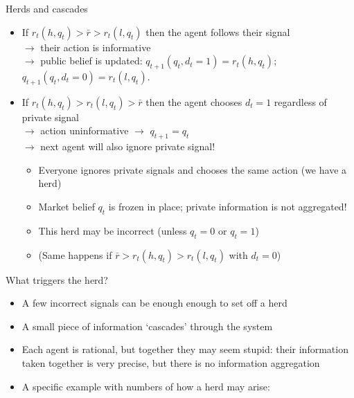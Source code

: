 \documentclass[english,10pt
,aspectratio=169
]{beamer}
\begin{document}
\begin{frame}{Herds and cascades}
	\begin{itemize}
		\item If $r_t(h,q_t) > \bar{r} > r_t(l,q_t)$ then the agent follows their signal 
		\\$\to$ their action is informative 
		\\$\to$ public belief is updated: $q_{t+1}(q_t,d_t=1) = r_t(h,q_t)$; $q_{t+1}(q_t,d_t=0) = r_t(l,q_t)$.
		
		\item If $r_t(h,q_t) > r_t(l,q_t) > \bar{r}$ then the agent chooses $d_t=1$ regardless of private signal 
		\\$\to$ action uninformative $\to$ $q_{t+1} = q_t$ 
		\\$\to$ next agent will also ignore private signal!
		\begin{itemize}
			\item Everyone ignores private signals and chooses the same action (we have a \alert{herd})
			\item Market belief $q_t$ is frozen in place; private information is not aggregated!
			\item This \alert{herd may be incorrect} (unless $q_t=0$ or $q_t=1$)
			\item (Same happens if $\bar{r} > r_t(h,q_t) > r_t(l,q_t)$ with $d_t=0$)
		\end{itemize}
	\end{itemize}
\end{frame}


\begin{frame}{What triggers the herd?} \label{HERD}
	\begin{itemize}
		\item A few incorrect signals can be enough enough to set off a herd
		\item A small piece of information `cascades' through the system
		\item Each agent is rational, but together they may seem stupid: their information taken together is very precise, but there is no information aggregation
		\item A specific example with numbers of how a herd may arise: \hyperlink{EXP}{}
	\end{itemize}
\end{frame}
\end{document}
